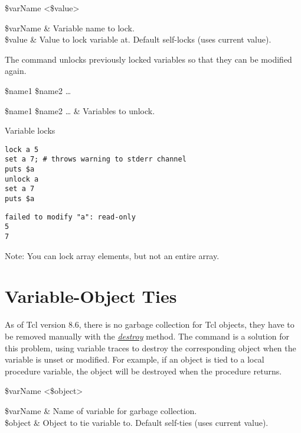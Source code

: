 \documentclass{article}
\begin{document}
\begin{syntax}
 \$varName <\$value>
\end{syntax}
\begin{args}
\$varName & Variable name to lock.  \\
\$value & Value to lock variable at. Default self-locks (uses current value).
\end{args}

The command  unlocks previously locked variables so that they can be modified again.
\begin{syntax}
 \$name1 \$name2 …
\end{syntax}
\begin{args}
\$name1 \$name2 … & Variables to unlock.
\end{args}

\begin{example}{Variable locks}
\begin{lstlisting}
lock a 5
set a 7; # throws warning to stderr channel
puts $a
unlock a
set a 7
puts $a
\end{lstlisting}
\tcblower
\begin{lstlisting}
failed to modify "a": read-only
5
7
\end{lstlisting}
\end{example}

Note: You can lock array elements, but not an entire array.

\clearpage
\section{Variable-Object Ties}
As of Tcl version 8.6, there is no garbage collection for Tcl objects, they have to be removed manually with the \textit{\href{https://www.tcl.tk/man/tcl8.6/TclCmd/object.html}{destroy}} method. 
The command  is a solution for this problem, using variable traces to destroy the corresponding object when the variable is unset or modified. 
For example, if an object is tied to a local procedure variable, the object will be destroyed when the procedure returns.

\begin{syntax}
 \$varName <\$object>
\end{syntax}
\begin{args}
\$varName & Name of variable for garbage collection. \\
\$object & Object to tie variable to. Default self-ties (uses current value).
\end{args}
\end{document}
